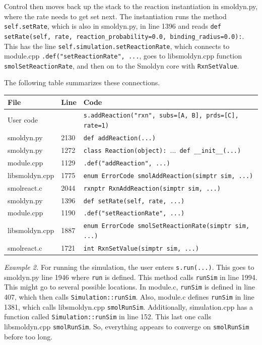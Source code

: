 \documentclass {scrbook}
\newcommand {\ttt} {\texttt}
\begin{document}
Control then moves back up the stack to the reaction instantiation in smoldyn.py, where the rate needs to get set next. The instantiation runs the method \ttt{self.setRate}, which is also in smoldyn.py, in line 1396 and reads \ttt{def setRate(self, rate, reaction\_probability=0.0, binding\_radius=0.0):}. This has the line \ttt{self.simulation.setReactionRate}, which connects to module.cpp \ttt{.def("setReactionRate", ...}, goes to libsmoldyn.cpp function \ttt{smolSetReactionRate}, and then on to the Smoldyn core with \ttt{RxnSetValue}.

The following table summarizes these connections.

\begin{longtable}[c]{lll}
File & Line & Code \\
\hline
User code & &\ttt{s.addReaction("rxn", subs=[A, B], prds=[C], rate=1)} \\
smoldyn.py & 2130 & \hspace{0.2cm} \ttt{def addReaction(...)} \\
smoldyn.py & 1272 & \hspace{0.4cm} \ttt{class Reaction(object): }...\ttt{ def \_\_init\_\_(...)} \\
module.cpp & 1129 & \hspace{0.6cm} \ttt{.def("addReaction", ...)} \\
libsmoldyn.cpp & 1775 & \hspace{0.8cm} \ttt{enum ErrorCode smolAddReaction(simptr sim, ...)} \\
smolreact.c & 2044 & \hspace{1cm} \ttt{rxnptr RxnAddReaction(simptr sim, ...)} \\
smoldyn.py & 1396 & \hspace{0.6cm} \ttt{def setRate(self, rate, ...)} \\
module.cpp & 1190 & \hspace{0.8cm} \ttt{.def("setReactionRate", ...)} \\
libsmoldyn.cpp & 1887 & \hspace{1cm} \ttt{enum ErrorCode smolSetReactionRate(simptr sim, ...)} \\
smolreact.c & 1721 & \hspace{1.2cm} \ttt{int RxnSetValue(simptr sim, ...)}
\end{longtable}

\textit{Example 2.} For running the simulation, the user enters \ttt{s.run(...)}. This goes to smoldyn.py line 1946 where \ttt{run} is defined. This method calls \ttt{runSim} in line 1994. This might go to several possible locations. In module.c, \ttt{runSim} is defined in line 407, which then calls \ttt{Simulation::runSim}. Also, module.c defines \ttt{runSim} in line 1381, which calls libsmoldyn.cpp \ttt{smolRunSim}. Additionally, simulation.cpp has a function called \ttt{Simulation::runSim} in line 152. This last one calls libsmoldyn.cpp \ttt{smolRunSim}. So, everything appears to converge on \ttt{smolRunSim} before too long.
\end{document}
